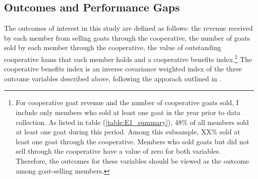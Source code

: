 \documentclass[11pt]{article}
\begin{document}
\subsection{Outcomes and Performance Gaps}

The outcomes of interest in this study are defined as follows: the revenue received by each member from selling goats through the cooperative, the number of goats sold by each member through the cooperative, the value of outstanding cooperative loans that each member holds and a cooperative benefits index.\footnote{For cooperative goat revenue and the number of cooperative goats sold, I include only members who sold at least one goat in the year prior to data collection. As listed in table (\ref{table:E1_summary}), 48\% of all members sold at least one goat during this period. Among this subsample, XX\% sold at least one goat through the cooperative. Members who sold goats but did not sell through the cooperative have a value of zero for both variables. Therefore, the outcomes for these variables should be viewed as the outcome among goat-selling members.} The cooperative benefits index is an inverse covariance weighted index of the three outcome variables described above, following the apporach outlined in \citet{anderson_multiple_2008}.
\end{document}
